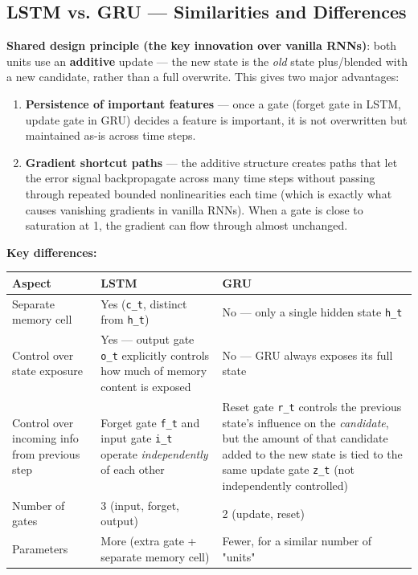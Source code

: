 \documentclass[12pt,openany]{book}
\theoremstyle{definition}
\theoremstyle{remark}
\begin{document}
\subsection{LSTM vs. GRU --- Similarities and Differences}

\textbf{Shared design principle (the key innovation over vanilla RNNs)}: both units use an \textbf{additive} update --- the new state is the \emph{old} state plus/blended with a new candidate, rather than a full overwrite. This gives two major advantages:

\begin{enumerate}
\item \textbf{Persistence of important features} --- once a gate (forget gate in LSTM, update gate in GRU) decides a feature is important, it is not overwritten but maintained as-is across time steps.
\item \textbf{Gradient shortcut paths} --- the additive structure creates paths that let the error signal backpropagate across many time steps without passing through repeated bounded nonlinearities each time (which is exactly what causes vanishing gradients in vanilla RNNs). When a gate is close to saturation at 1, the gradient can flow through almost unchanged.

\end{enumerate}
\textbf{Key differences:}

{\small
\begin{longtable}{@{}L{0.20\textwidth}L{0.34\textwidth}L{0.38\textwidth}@{}}
\toprule
Aspect & LSTM & GRU \\
\midrule
Separate memory cell & Yes (\texttt{c\_t}, distinct from \texttt{h\_t}) & No --- only a single hidden state \texttt{h\_t} \\
Control over state exposure & Yes --- output gate \texttt{o\_t} explicitly controls how much of memory content is exposed & No --- GRU always exposes its full state \\
Control over incoming info from previous step & Forget gate \texttt{f\_t} and input gate \texttt{i\_t} operate \emph{independently} of each other & Reset gate \texttt{r\_t} controls the previous state's influence on the \emph{candidate}, but the amount of that candidate added to the new state is tied to the same update gate \texttt{z\_t} (not independently controlled) \\
Number of gates & 3 (input, forget, output) & 2 (update, reset) \\
Parameters & More (extra gate + separate memory cell) & Fewer, for a similar number of "units" \\
\bottomrule
\end{longtable}
}
\end{document}
